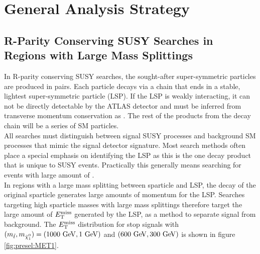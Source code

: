\chapter{General Analysis Strategy}
\label{chap:AnaStrategy}
\section{ R-Parity Conserving SUSY Searches in Regions with Large Mass Splittings }

\indent In R-parity conserving SUSY searches, the sought-after super-symmetric particles are produced in pairs.  Each particle decays via a chain that ends in a stable, lightest super-symmetric particle (LSP).  If the LSP is weakly interacting, it can not be directly detectable by the ATLAS detector and must be inferred from transverse momentum conservation as \MET.  The rest of the products from the decay chain will be a series of SM particles.  ~\\

\indent All searches must distinguish between signal SUSY processes and background SM processes that mimic the signal detector signature.  Most search methods often place a special emphasis on identifying the LSP as this is the one decay product that is unique to SUSY events.  Practically this generally means searching for events with large amount of \MET.  \\

\indent In regions with a large mass splitting between sparticle and LSP, the decay of the original sparticle generates large amounts of momentum for the LSP.  Searches targeting high sparticle masses with large mass splittings therefore target the large amount of $E_{\mathrm{T}}^{\mathrm{miss}}$ generated by the LSP, as a method to separate signal from background. The $E_{\mathrm{T}}^{\mathrm{miss}}$ distribution for stop signals with $(m_{\stop}, m_{\ninoone}) = (1000 \gev,1 \gev)$ and $(600 \gev, 300 \gev)$ is shown in figure \ref{fig:presel:MET1}. ~\\

